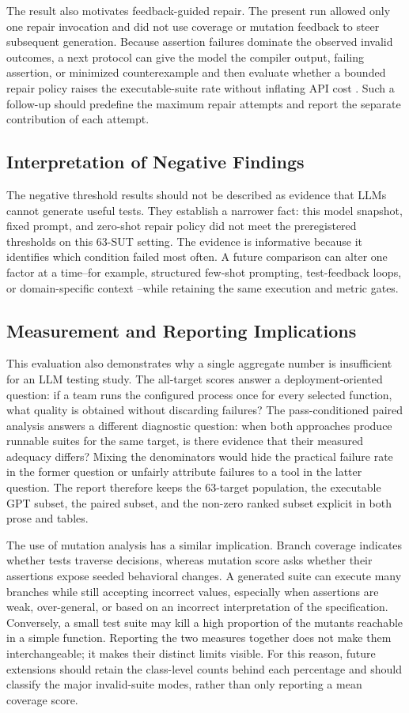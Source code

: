 The result also motivates feedback-guided repair. The present run allowed only one repair invocation and did not use coverage or mutation feedback to steer subsequent generation. Because assertion failures dominate the observed invalid outcomes, a next protocol can give the model the compiler output, failing assertion, or minimized counterexample and then evaluate whether a bounded repair policy raises the executable-suite rate without inflating API cost \cite{yang2025react, pham2025llmloop}. Such a follow-up should predefine the maximum repair attempts and report the separate contribution of each attempt.

\subsection{Interpretation of Negative Findings}
The negative threshold results should not be described as evidence that LLMs cannot generate useful tests. They establish a narrower fact: this model snapshot, fixed prompt, and zero-shot repair policy did not meet the preregistered thresholds on this 63-SUT setting. The evidence is informative because it identifies which condition failed most often. A future comparison can alter one factor at a time--for example, structured few-shot prompting, test-feedback loops, or domain-specific context \cite{vy2025whatinputs}--while retaining the same execution and metric gates.

\subsection{Measurement and Reporting Implications}
This evaluation also demonstrates why a single aggregate number is insufficient for an LLM testing study. The all-target scores answer a deployment-oriented question: if a team runs the configured process once for every selected function, what quality is obtained without discarding failures? The pass-conditioned paired analysis answers a different diagnostic question: when both approaches produce runnable suites for the same target, is there evidence that their measured adequacy differs? Mixing the denominators would hide the practical failure rate in the former question or unfairly attribute failures to a tool in the latter question. The report therefore keeps the 63-target population, the executable GPT subset, the paired subset, and the non-zero ranked subset explicit in both prose and tables.

The use of mutation analysis has a similar implication. Branch coverage indicates whether tests traverse decisions, whereas mutation score asks whether their assertions expose seeded behavioral changes. A generated suite can execute many branches while still accepting incorrect values, especially when assertions are weak, over-general, or based on an incorrect interpretation of the specification. Conversely, a small test suite may kill a high proportion of the mutants reachable in a simple function. Reporting the two measures together does not make them interchangeable; it makes their distinct limits visible. For this reason, future extensions should retain the class-level counts behind each percentage and should classify the major invalid-suite modes, rather than only reporting a mean coverage score.

